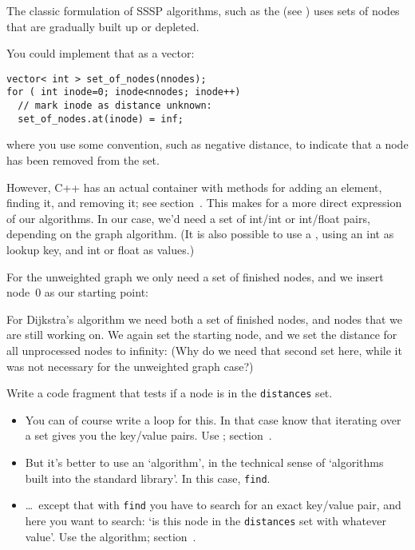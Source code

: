 The classic formulation of \ac{SSSP} algorithms,
such as the 
(see )
uses sets of nodes that are gradually built up or depleted.

You could implement that as a vector:
\begin{lstlisting}
vector< int > set_of_nodes(nnodes);
for ( int inode=0; inode<nnodes; inode++)
  // mark inode as distance unknown:
  set_of_nodes.at(inode) = inf;
\end{lstlisting}
where you use some convention, such as negative distance,
to indicate that a node has been removed from the set.

However, C++ has an actual  container with methods
for adding an element, finding it, and removing it; see section~.
This makes for a more direct expression of our algorithms.
In our case, we'd need a set of int/int or int/float pairs,
depending on the graph algorithm.
(It is also possible to use a , using an int as lookup key,
and int or float as values.)

For the unweighted graph we only need a set of finished nodes,
and we insert node~0 as our starting point:

For Dijkstra's algorithm we need both a set of finished nodes,
and nodes that we are still working on.
We again set the starting node, and we set the distance
for all unprocessed nodes to infinity:
(Why do we need that second set here, while it was not
necessary for the unweighted graph case?)

\begin{exercise}
  Write a code fragment that tests if a node is in the \lstinline{distances} set.
  \begin{itemize}
  \item You can of course write a loop for this.
    In that case know that iterating over a set gives you the key/value pairs.
    Use ; section~.
  \item But it's better to use an `algorithm', in the technical sense of
    `algorithms built into the standard library'. In this case, \lstinline{find}.
  \item \ldots~except that with \lstinline{find} you have to search for an exact
    key/value pair, and here you want to search: `is this node
    in the \lstinline{distances} set with whatever value'.
    Use the  algorithm; section~.
  \end{itemize}
\end{exercise}

